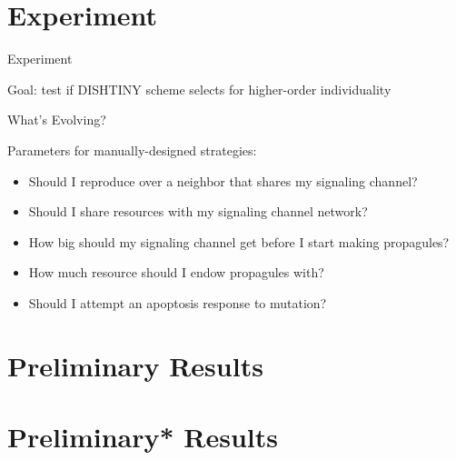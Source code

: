 \section{Experiment}

\begin{frame}{Experiment}

Goal: test if DISHTINY scheme selects for higher-order individuality

\end{frame}

\begin{frame}{What's Evolving?}

Parameters for manually-designed strategies:
\pause
\begin{itemize}[<+->]
\item Should I reproduce over a neighbor that shares my signaling channel?
\item Should I share resources with my signaling channel network?
\item How big should my signaling channel get before I start making propagules?
\item How much resource should I endow propagules with?
\item Should I attempt an apoptosis response to mutation?
\end{itemize}
\end{frame}

\section{Preliminary Results}
\section{Preliminary\** Results}


